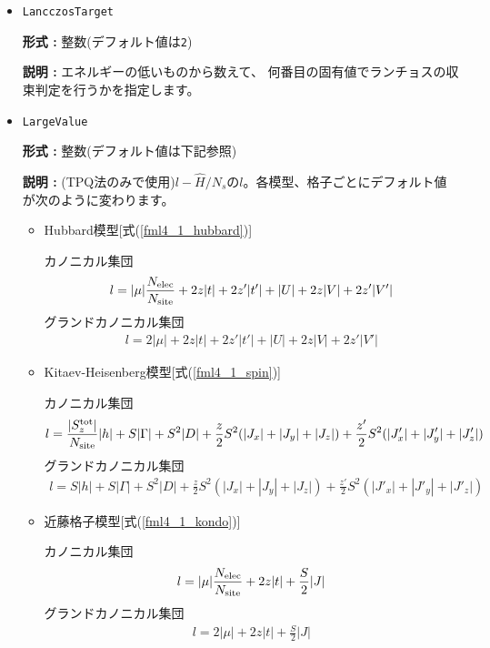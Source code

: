 \begin{itemize}
{\bf 説明 :} ランチョスの収束判定条件を指定します。
ひとつ前のステップの固有値との相対誤差が, $10^{-{\tt LanczosEps}}$以下になったら収束したと判断します。

\item \verb|LancczosTarget|

{\bf 形式 :} 整数(デフォルト値は\verb|2|)

{\bf 説明 :} エネルギーの低いものから数えて、
何番目の固有値でランチョスの収束判定を行うかを指定します。

\item \verb|LargeValue|

{\bf 形式 :} 整数(デフォルト値は下記参照)

{\bf 説明 :} (TPQ法のみで使用)$l-\hat{H}/N_{s}$の$l$。各模型、格子ごとにデフォルト値が次のように変わります。

\begin{itemize}

\item Hubbard模型[式(\ref{fml4_1_hubbard})]

カノニカル集団
\begin{align}
l = |\mu| \frac{N_{\rm elec}}{N_{\rm site}}
+ 2 z |t| + 2 z' |t'| + |U| + 2 z |V| + 2 z' |V'| 
\end{align}
グランドカノニカル集団
\begin{align}
l = 2|\mu|
+ 2 z |t| + 2 z' |t'| + |U| + 2 z |V| + 2 z' |V'|
\end{align}

\item Kitaev-Heisenberg模型[式(\ref{fml4_1_spin})]

カノニカル集団
\begin{align}
l = \frac{|S_z^{\rm tot}|}{N_{\rm site}}|h| + S |\Gamma| + S^2 |D|
+\frac{z}{2} S^2 (|J_x|+|J_y|+|J_z|) +\frac{z'}{2} S^2 (|J'_x|+|J'_y|+|J'_z|)
\end{align}
グランドカノニカル集団
\begin{align}
l = S |h| + S |\Gamma| + S^2 |D|
+\frac{z}{2} S^2 (|J_x|+|J_y|+|J_z|) + \frac{z'}{2} S^2 (|J'_x|+|J'_y|+|J'_z|) 
\end{align}

\item 近藤格子模型[式(\ref{fml4_1_kondo})]

カノニカル集団
\begin{align}
l = |\mu| \frac{N_{\rm elec}}{N_{\rm site}} + 2 z |t| + \frac{S}{2} |J| 
\end{align}
グランドカノニカル集団
\begin{align}
l = 2|\mu| + 2 z |t| + \frac{S}{2} |J| 
\end{align}


\end{itemize}
\end{itemize}
